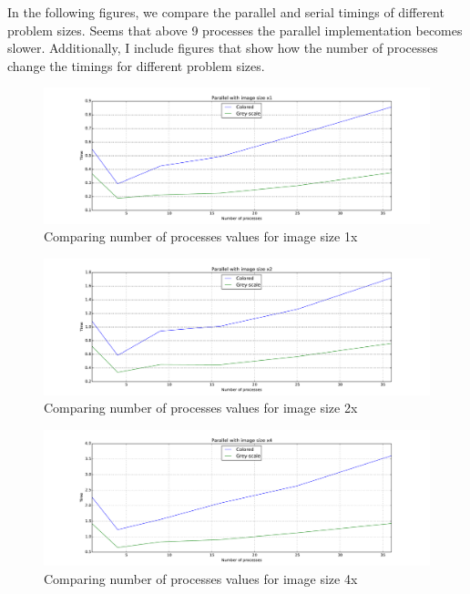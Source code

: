 \documentclass[11pt,a4paper,oneside]{article}
\begin{document}
In the following figures, we compare the parallel and serial timings of
different problem sizes. Seems that above 9 processes the parallel
implementation becomes slower. Additionally, I include figures that show how
the number of processes change the timings for different problem sizes.

\begin{figure}[h]
    \centering
    \includegraphics[width=\textwidth]{parallel-1.pdf}
    \caption{Comparing number of processes values for image size 1x}
\end{figure}

\begin{figure}[h]
    \centering
    \includegraphics[width=\textwidth]{parallel-2.pdf}
    \caption{Comparing number of processes values for image size 2x}
\end{figure}

\begin{figure}[h]
    \centering
    \includegraphics[width=\textwidth]{parallel-4.pdf}
    \caption{Comparing number of processes values for image size 4x}
\end{figure}
\end{document}
